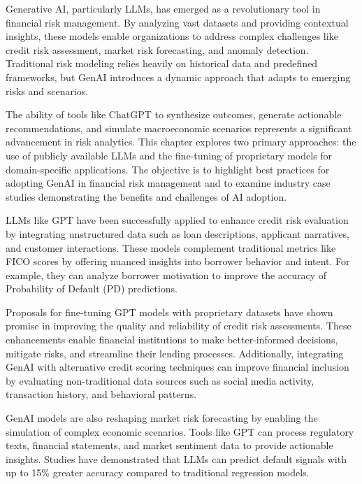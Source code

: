 \documentclass[a4paper,headinclude=on,footinclude=on,12pt,oneside]{scrbook}
\begin{document}
	
	Generative AI, particularly LLMs, has emerged as a revolutionary tool in financial risk management. By analyzing vast datasets and providing contextual insights, these models enable organizations to address complex challenges like credit risk assessment, market risk forecasting, and anomaly detection. Traditional risk modeling relies heavily on historical data and predefined frameworks, but GenAI introduces a dynamic approach that adapts to emerging risks and scenarios.
	
	The ability of tools like ChatGPT to synthesize outcomes, generate actionable recommendations, and simulate macroeconomic scenarios represents a significant advancement in risk analytics. This chapter explores two primary approaches: the use of publicly available LLMs and the fine-tuning of proprietary models for domain-specific applications. The objective is to highlight best practices for adopting GenAI in financial risk management and to examine industry case studies demonstrating the benefits and challenges of AI adoption.
	
	
	
	LLMs like GPT have been successfully applied to enhance credit risk evaluation by integrating unstructured data such as loan descriptions, applicant narratives, and customer interactions. These models complement traditional metrics like FICO scores by offering nuanced insights into borrower behavior and intent. For example, they can analyze borrower motivation to improve the accuracy of Probability of Default (PD) predictions.
	
	Proposals for fine-tuning GPT models with proprietary datasets have shown promise in improving the quality and reliability of credit risk assessments. These enhancements enable financial institutions to make better-informed decisions, mitigate risks, and streamline their lending processes. Additionally, integrating GenAI with alternative credit scoring techniques can improve financial inclusion by evaluating non-traditional data sources such as social media activity, transaction history, and behavioral patterns.
	
	
	GenAI models are also reshaping market risk forecasting by enabling the simulation of complex economic scenarios. Tools like GPT can process regulatory texts, financial statements, and market sentiment data to provide actionable insights. Studies have demonstrated that LLMs can predict default signals with up to 15\% greater accuracy compared to traditional regression models.
	
\end{document}
